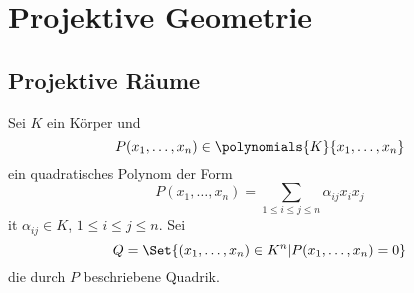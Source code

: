 \chapter{Projektive Geometrie}
\section{Projektive Räume}

Sei \( K \) ein Körper und 
\begin{equation*}
  P(x_1,\dotsc, x_n)\in \polynomials{K}{x_1,\dotsc,x_n}
\end{equation*}
ein quadratisches Polynom der Form 
\begin{equation*}
  P(x_1,\dotsc,x_n)=\sum_{1\leq i\leq j \leq n}\alpha_{ij}x_i x_j
\end{equation*}
it \( \alpha_{ij}\in K \), \( 1\leq i \leq j\leq n \). Sei
\begin{equation*}
  Q=\Set{(x_1,\dotsc,x_n)\in K^n|P(x_1,\dotsc,x_n)=0}
\end{equation*}
die durch \( P \) beschriebene Quadrik.


